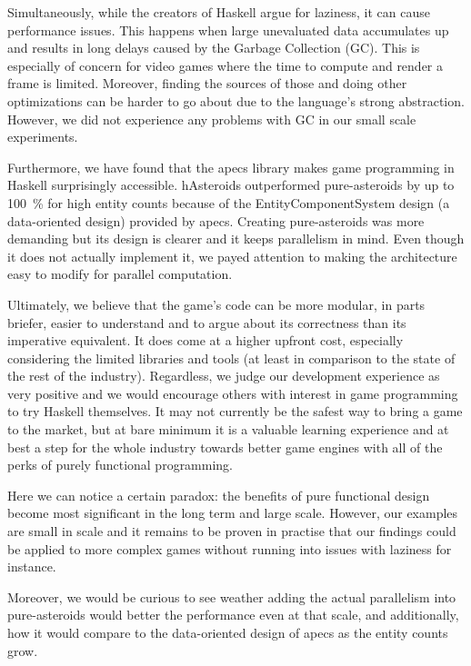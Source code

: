 \documentclass[
  digital, %
  color,   %
  table,   %
  oneside, %
  lof,     %
  lot,     %
]{fithesis3}
\begin{document}
{Simultaneously, while the creators of Haskell argue for laziness, it can cause performance issues.
This happens when large unevaluated data accumulates up and results in long delays caused
by the Garbage Collection (GC). This is especially of concern for video games where the time to
compute and render a frame is limited. Moreover, finding the sources of those 
and doing other optimizations can be harder to go about due to the language's strong abstraction.
However, we did not experience any problems with GC in our small scale experiments.

Furthermore, we have found that the apecs library makes game programming in Haskell surprisingly
accessible. hAsteroids outperformed pure-asteroids by up to 100~\% for high entity counts
because of the Entity\textendash{}Component\textendash{}System design (a data-oriented design)
provided by apecs.
Creating pure-asteroids was more demanding but its design is clearer and it keeps
parallelism in mind. Even though it does not actually implement it, we payed attention
to making the architecture easy to modify for parallel computation.

Ultimately, we believe that the game's code can be more modular, in parts briefer,
easier to understand and to argue about its correctness than its imperative equivalent.
It does come at a higher upfront cost, especially considering the limited libraries and tools
(at least in comparison to the state of the rest of the industry).
Regardless, we judge our development experience as very positive and we would encourage others
with interest in game programming to try Haskell themselves.
It may not currently be the safest way to bring a game to the market,
but at bare minimum it is a valuable learning experience and at best a step for the whole industry
towards better game engines with all of the perks of purely functional programming.

Here we can notice a certain paradox: the benefits of pure functional design
become most significant in the long term and large scale.
However, our examples are small in scale and it remains to be proven
in practise that our findings could be applied to more complex games
without running into issues with laziness for instance.

Moreover, we would be curious to see weather adding the actual parallelism into pure-asteroids
would better the performance even at that scale, and additionally,
how it would compare to the data-oriented design of apecs as the entity counts grow.





}
\end{document}
